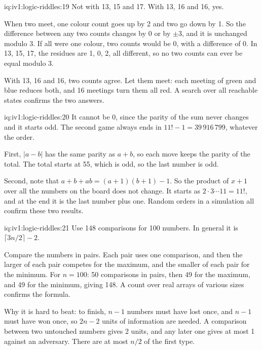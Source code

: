 \begin{solution}{iq:iv1:logic-riddles:19}
Not with 13, 15 and 17. With 13, 16 and 16, yes.

When two meet, one colour count goes up by 2 and two go down by 1. So the difference between any two counts changes by 0 or by $\pm 3$, and it is unchanged modulo 3. If all were one colour, two counts would be 0, with a difference of 0. In 13, 15, 17, the residues are 1, 0, 2, all different, so no two counts can ever be equal modulo 3.

With 13, 16 and 16, two counts agree. Let them meet: each meeting of green and blue reduces both, and 16 meetings turn them all red. A search over all reachable states confirms the two answers.

\end{solution}

\begin{solution}{iq:iv1:logic-riddles:20}
It cannot be 0, since the parity of the sum never changes and it starts odd. The second game always ends in $11! - 1 = 39\,916\,799$, whatever the order.

First, $|a - b|$ has the same parity as $a + b$, so each move keeps the parity of the total. The total starts at 55, which is odd, so the last number is odd.

Second, note that $a + b + ab = (a + 1)(b + 1) - 1$. So the product of $x + 1$ over all the numbers on the board does not change. It starts as $2 \cdot 3 \cdots 11 = 11!$, and at the end it is the last number plus one. Random orders in a simulation all confirm these two results.

\end{solution}

\begin{solution}{iq:iv1:logic-riddles:21}
Use 148 comparisons for 100 numbers. In general it is $\lceil 3n/2 \rceil - 2$.

Compare the numbers in pairs. Each pair uses one comparison, and then the larger of each pair competes for the maximum, and the smaller of each pair for the minimum. For $n = 100$: 50 comparisons in pairs, then 49 for the maximum, and 49 for the minimum, giving 148. A count over real arrays of various sizes confirms the formula.

Why it is hard to beat: to finish, $n - 1$ numbers must have lost once, and $n - 1$ must have won once, so $2n - 2$ units of information are needed. A comparison between two untouched numbers gives 2 units, and any later one gives at most 1 against an adversary. There are at most $n/2$ of the first type.

\end{solution}

